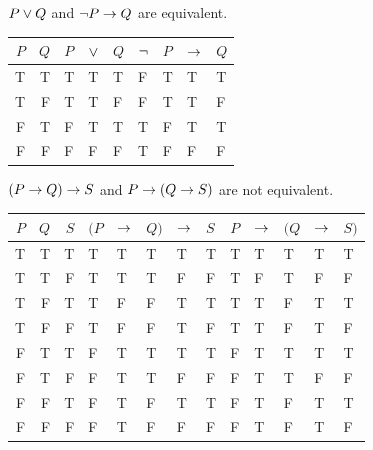 \begin{small}
\begin{earg}
\item $P \vee Q$ and ${\neg} P \rightarrow Q$ are equivalent.
\begin{flushleft}
\begin{tabular}{d d | f e h | f e e e}
$P$ & $Q$ & $P$ & $\vee$ & $Q$ & ${\neg}$ & $P$ & $\rightarrow$ & $Q$\\
\hline
T & T &    T & T & T &     F & T & T & T\Tstrut\\
T & F &    T & T & F &     F & T & T & F\\
F & T &    F & T & T &     T & F & T & T\\
F & F &    F & F & F &     T & F & F & F 
\end{tabular}
\end{flushleft}\medskip

\item $(P \rightarrow Q) \rightarrow S$ and $P \rightarrow (Q \rightarrow S)$ are not equivalent.
\begin{flushleft}
\begin{tabular}{d d d | f e e e h | f e e e e}
$P$ & $Q$ & $S$ & $(P$ & $\rightarrow$ & $Q)$ & $\rightarrow$ & $S$ & $P$ & $\rightarrow$ & $(Q$ & $\rightarrow$ & $S)$\\
\hline
T & T & T &      T & T & T &   T & T &      T & T &   T & T & T\Tstrut\\
T & T & F &      T & T & T &   F & F &      T & F &   T & F & F\\
T & F & T &      T & F & F &   T & T &      T & T &   F & T & T\\
T & F & F &      T & F & F &   T & F &      T & T &   F & T & F\\\hline
F & T & T &      F & T & T &   T & T &      F & T &   T & T & T\Tstrut\\
F & T & F &      F & T & T &   F & F &      F & T &   T & F & F\\
F & F & T &      F & T & F &   T & T &      F & T &   F & T & T\\
F & F & F &      F & T & F &   F & F &      F & T &   F & T & F 
\end{tabular}
\end{flushleft}\medskip


\end{earg}
\end{small}
